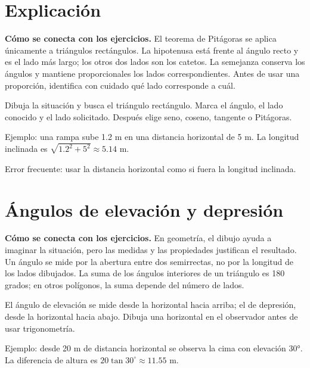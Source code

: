 \documentclass[10pt,oneside,openany]{book}
\begin{document}
\section{Explicación}

\textbf{Cómo se conecta con los ejercicios.} El teorema de Pitágoras se aplica únicamente a triángulos rectángulos. La hipotenusa está frente al ángulo recto y es el lado más largo; los otros dos lados son los catetos. La semejanza conserva los ángulos y mantiene proporcionales los lados correspondientes. Antes de usar una proporción, identifica con cuidado qué lado corresponde a cuál.

Dibuja la situación y busca el triángulo rectángulo. Marca el ángulo, el lado conocido y el lado solicitado. Después elige seno, coseno, tangente o Pitágoras.



\begin{ejemplo}
Ejemplo: una rampa sube 1.2 m en una distancia horizontal de 5 m. La longitud inclinada es $\sqrt{1.2^2+5^2}\approx5.14$ m.
\end{ejemplo}

\begin{ojo}
Error frecuente: usar la distancia horizontal como si fuera la longitud inclinada.
\end{ojo}



\section{Ángulos de elevación y depresión}

\textbf{Cómo se conecta con los ejercicios.} En geometría, el dibujo ayuda a imaginar la situación, pero las medidas y las propiedades justifican el resultado. Un ángulo se mide por la abertura entre dos semirrectas, no por la longitud de los lados dibujados. La suma de los ángulos interiores de un triángulo es 180 grados; en otros polígonos, la suma depende del número de lados.

El ángulo de elevación se mide desde la horizontal hacia arriba; el de depresión, desde la horizontal hacia abajo. Dibuja una horizontal en el observador antes de usar trigonometría.

\begin{ejemplo}
Ejemplo: desde 20 m de distancia horizontal se observa la cima con elevación 30°. La diferencia de altura es $20\tan30^\circ\approx11.55$ m.
\end{ejemplo}
\end{document}
